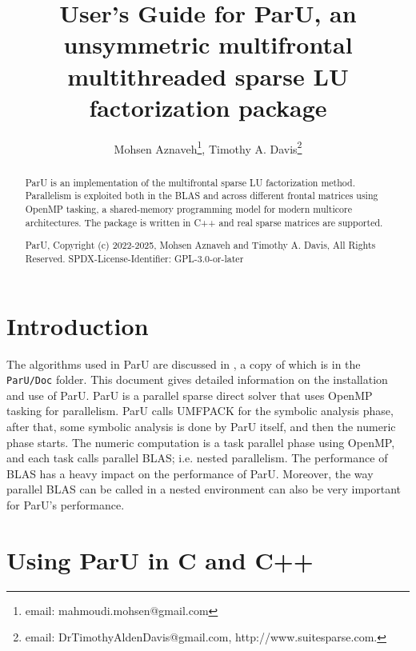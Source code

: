 \documentclass[12pt]{article}
\title{User's Guide for ParU, an unsymmetric multifrontal multithreaded sparse
LU factorization package}
\author{Mohsen Aznaveh\thanks{email:  mahmoudi.mohsen@gmail.com},
Timothy A. Davis\thanks{email: DrTimothyAldenDavis@gmail.com,
http://www.suitesparse.com.}}
\begin{document}
\maketitle

\begin{abstract}

ParU is an implementation of the multifrontal sparse LU factorization method.
Parallelism is exploited both in the BLAS and across different frontal matrices
using OpenMP tasking, a shared-memory programming model for modern multicore
architectures. The package is written in C++ and real sparse matrices are
supported.

ParU, Copyright (c) 2022-2025, Mohsen Aznaveh and Timothy A. Davis,
All Rights Reserved.
SPDX-License-Identifier: GPL-3.0-or-later
\end{abstract}

\newpage
{\small
\tableofcontents
}

\section{Introduction}
\label{intro}

The algorithms used in ParU are discussed in \cite{AznavehThesis},
a copy of which is in the \verb'ParU/Doc' folder.
This document gives detailed information on the installation and use of ParU.
ParU is a parallel sparse direct solver that uses OpenMP tasking for
parallelism. ParU calls UMFPACK for the symbolic analysis phase, after that,
some symbolic analysis is done by ParU itself, and then the numeric phase
starts. The numeric computation is a task parallel phase using OpenMP, and each
task calls parallel BLAS; i.e. nested parallelism.  The performance of BLAS has
a heavy impact on the performance of ParU. Moreover, the way parallel BLAS can
be called in a nested environment can also be very important for ParU's
performance.

\section{Using ParU in C and C++}
\end{document}
